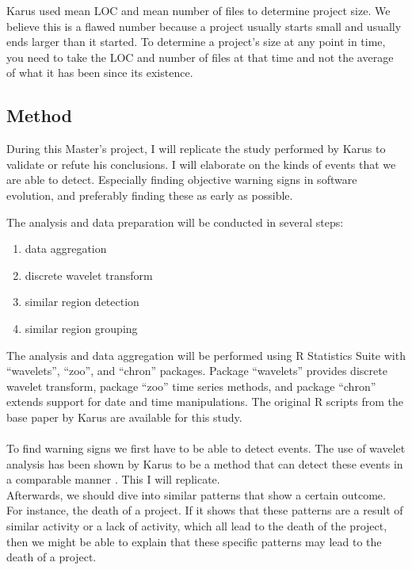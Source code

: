Karus used mean LOC and mean number of files to determine project size. We
believe this is a flawed number because a project usually starts small and
usually ends larger than it started. To determine a project's size at any point
in time, you need to take the LOC and number of files at that time and not the
average of what it has been since its existence.

\subsection{Method}
During this Master's project, I will replicate the study performed by Karus to
validate or refute his conclusions. I will elaborate on the kinds of events
that we are able to detect. Especially finding objective warning signs in
software evolution, and preferably finding these as early as possible.

The analysis and data preparation will be conducted in several steps:
\begin{enumerate}
	\item data aggregation
	\item discrete wavelet transform
	\item similar region detection
	\item similar region grouping
\end{enumerate}
The analysis and data aggregation will be performed using R Statistics Suite
with ``wavelets'', ``zoo'', and ``chron'' packages. Package ``wavelets''
provides discrete wavelet transform, package ``zoo'' time series methods, and
package ``chron'' extends support for date and time manipulations. The original
R scripts from the base paper by Karus \cite{karus2013} are available for this
study.

\paragraph{}
To find warning signs we first have to be able to detect events. The use
of wavelet analysis has been shown by Karus to be a method that can detect these
events in a comparable manner \cite{karus2013}. This I will replicate.
\\

Afterwards, we should dive into similar patterns that show a certain outcome.
For instance, the death of a project. If it shows that these patterns are a
result of similar activity or a lack of activity, which all lead to the death of
the project, then we might be able to explain that these specific patterns may
lead to the death of a project.
\\

